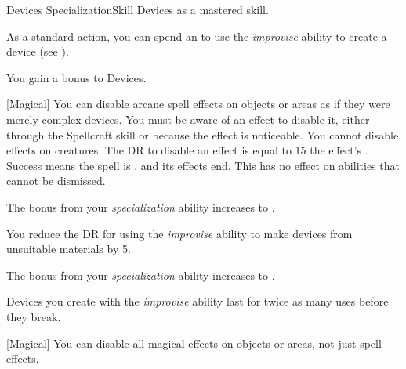     \begin{feat}{Devices Specialization}{Skill}
        \featpre Devices as a mastered skill.

         As a standard action, you can spend an  to use the \textit{improvise} ability to create a device (see ).

         You gain a  bonus to Devices.

        [Magical] You can disable arcane spell effects on objects or areas as if they were merely complex devices.
        You must be aware of an effect to disable it, either through the Spellcraft skill or because the effect is noticeable.
        You cannot disable effects on creatures.
        The DR to disable an effect is equal to 15 \add the effect's .
        Success means the spell is , and its effects end.
        This has no effect on abilities that cannot be dismissed.

         The bonus from your \textit{specialization} ability increases to .

         You reduce the DR for using the \textit{improvise} ability to make devices from unsuitable materials by 5.

         The bonus from your \textit{specialization} ability increases to .

         Devices you create with the \textit{improvise} ability last for twice as many uses before they break.

        [Magical] You can disable all magical effects on objects or areas, not just spell effects.
    \end{feat}

